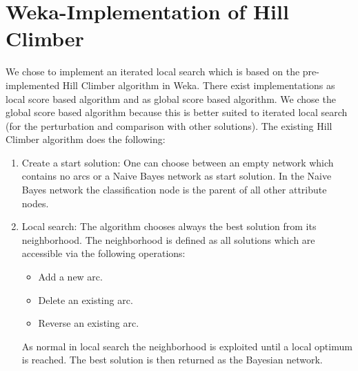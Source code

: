 \documentclass[paper=a4, fontsize=11pt]{scrartcl} %
\numberwithin{equation}{section} %
\numberwithin{figure}{section} %
\numberwithin{table}{section} %
\begin{document}
%
%
%
%
%
%

%
%
%
\section{Weka-Implementation of Hill Climber}

We chose to implement an iterated local search which is based on the pre-implemented Hill Climber algorithm in Weka. There exist implementations as local score based algorithm and as global score based algorithm.  We chose the global score based algorithm because this is better suited to iterated local search (for the perturbation and comparison with other solutions). The existing Hill Climber algorithm does the following:

\begin{enumerate}
	\item Create a start solution: One can choose between an empty network which contains no arcs or a Naive Bayes network as start solution. In the Naive Bayes network the classification node is the parent of all other attribute nodes.
	\item Local search: The algorithm chooses always the best solution from its neighborhood. The neighborhood is defined as all solutions which are accessible via the following operations:
		\begin{itemize}
			\item Add a new arc.
			\item Delete an existing arc.
			\item Reverse an existing arc.
		\end{itemize}
		As normal in local search the neighborhood is exploited until a local optimum is reached. The best solution is then returned as the Bayesian network.
\end{enumerate}
\end{document}
